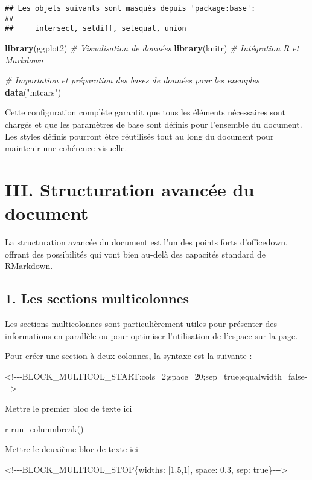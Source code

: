 \documentclass[
]{article}
\newenvironment{Shaded}{\begin{snugshade}}{\end{snugshade}}
\newcommand{\CommentTok}[1]{\textcolor[rgb]{0.56,0.35,0.01}{\textit{#1}}}
\newcommand{\FunctionTok}[1]{\textcolor[rgb]{0.13,0.29,0.53}{\textbf{#1}}}
\newcommand{\NormalTok}[1]{#1}
\newcommand{\StringTok}[1]{\textcolor[rgb]{0.31,0.60,0.02}{#1}}
\begin{document}
\begin{verbatim}
## Les objets suivants sont masqués depuis 'package:base':
## 
##     intersect, setdiff, setequal, union
\end{verbatim}

\begin{Shaded}
\begin{Highlighting}[]
\FunctionTok{library}\NormalTok{(ggplot2)         }\CommentTok{\# Visualisation de données}
\FunctionTok{library}\NormalTok{(knitr)           }\CommentTok{\# Intégration R et Markdown}


\CommentTok{\# Importation et préparation des bases de données pour les exemples}
\FunctionTok{data}\NormalTok{(}\StringTok{"mtcars"}\NormalTok{)}
\end{Highlighting}
\end{Shaded}

Cette configuration complète garantit que tous les éléments nécessaires
sont chargés et que les paramètres de base sont définis pour l'ensemble
du document. Les styles définis pourront être réutilisés tout au long du
document pour maintenir une cohérence visuelle.

\section{III. Structuration avancée du
document}\label{iii.-structuration-avancuxe9e-du-document}

La structuration avancée du document est l'un des points forts
d'officedown, offrant des possibilités qui vont bien au-delà des
capacités standard de RMarkdown.

\subsection{1. Les sections
multicolonnes}\label{les-sections-multicolonnes}

Les sections multicolonnes sont particulièrement utiles pour présenter
des informations en parallèle ou pour optimiser l'utilisation de
l'espace sur la page.

Pour créer une section à deux colonnes, la syntaxe est la suivante :

\begin{Shaded}
\begin{Highlighting}[]
\NormalTok{\textless{}!{-}{-}{-}BLOCK\_MULTICOL\_START:cols=2;space=20;sep=true;equalwidth=false{-}{-}{-}\textgreater{}}

\NormalTok{Mettre le premier bloc de texte ici}

\NormalTok{r run\_columnbreak()}

\NormalTok{Mettre le deuxième bloc de texte ici}

\NormalTok{\textless{}!{-}{-}{-}BLOCK\_MULTICOL\_STOP\{widths: [1.5,1], space: 0.3, sep: true\}{-}{-}{-}\textgreater{}}
\end{Highlighting}
\end{Shaded}
\end{document}

